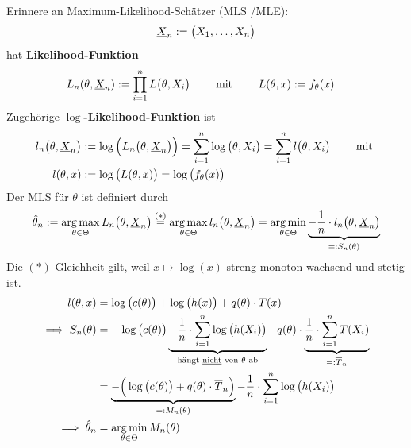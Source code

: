 
Erinnere an Maximum-Likelihood-Schätzer (MLS /MLE):
\begin{align*}
	\underline{X}_n:=\big(X_1,\ldots,X_n\big)
\end{align*}
hat \textbf{Likelihood-Funktion}
\begin{align*}
	L_n(\theta,\underline{X}_n)&:=\prod\limits_{i=1}^n L\big(\theta,X_i\big)
	\qquad\text{ mit }\qquad
	L(\theta,x):=f_\theta(x)
\end{align*}
Zugehörige \textbf{$\log$-Likelihood-Funktion} ist
\begin{align*}
	l_n\big(\theta,\underline{X}_n\big)&:=\log\Big(L_n\big(\theta,\underline{X}_n\big)\Big)
	=\sum\limits_{i=1}^n\log\big(\theta,X_i\big)
	=\sum\limits_{i=1}^n l\big(\theta,X_i\big)\qquad\text{ mit }
\\
l(\theta,x)&:=\log\big(L(\theta,x)\big)=\log\big(f_\theta(x)\big)
\end{align*}
Der MLS für $\theta$ ist definiert durch
\begin{align*}
	\hat{\theta}_n
	:=\operatorname*{arg\,max}\limits_{\theta\in\Theta}L_n\big(\theta,\underline{X}_n\big)
	\overset{(\ast)}{=}
	\operatorname*{arg\,max}\limits_{\theta\in\Theta} l_n\big(\theta,\underline{X}_n\big)
	=\operatorname*{arg\,min}\limits_{\theta\in\Theta}\underbrace{-\frac{1}{n}\cdot  l_n\big(\theta,\underline{X}_n\big)}_{=:S_n(\theta)}
\end{align*}
Die $(\ast)$-Gleichheit gilt, weil $x\mapsto\log(x)$ streng monoton wachsend und stetig ist.
\begin{align*}
	l(\theta,x)&=\log\big(c(\theta)\big)+\log\big(h(x)\big)+q(\theta)\cdot T(x)\\
	\implies S_n(\theta)&=-\log\big(c(\theta)\big)\underbrace{-\frac{1}{n}\cdot\sum\limits_{i=1}^n\log\big(h(X_i)\big)}_{\text{hängt \underline{nicht} von $\theta$ ab}}-q(\theta)\cdot\underbrace{\frac{1}{n}\cdot\sum\limits_{i=1}^n T(X_i)}_{=:\overline{T}_n}\\
	&=\underbrace{-\Big(\log\big(c(\theta)\big)+q(\theta)\cdot\overline{T}_n\Big)}_{=:M_n(\theta)}-\frac{1}{n}\cdot\sum\limits_{i=1}^n\log\big(h(X_i)\big)\\
	\implies\hat{\theta}_n
	&=\operatorname*{arg\,min}\limits_{\theta\in\Theta} M_n(\theta)
\end{align*}


